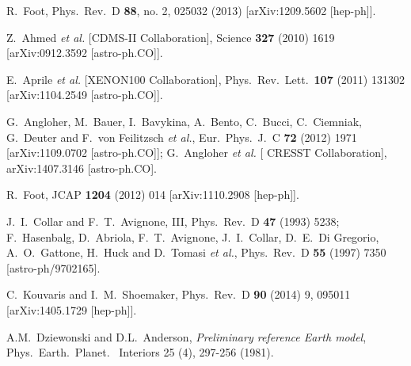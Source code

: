 \documentclass[12pt]{article}
\begin{document}
\begin{thebibliography}{999}
  
  R.~Foot,
  Phys.\ Rev.\ D {\bf 88}, no. 2, 025032 (2013)
  [arXiv:1209.5602 [hep-ph]].
  
  Z.~Ahmed {\it et al.}  [CDMS-II Collaboration],
  Science {\bf 327} (2010) 1619
  [arXiv:0912.3592 [astro-ph.CO]].
  
  E.~Aprile {\it et al.}  [XENON100 Collaboration],
  Phys.\ Rev.\ Lett.\  {\bf 107} (2011) 131302
  [arXiv:1104.2549 [astro-ph.CO]].
  
  G.~Angloher, M.~Bauer, I.~Bavykina, A.~Bento, C.~Bucci, C.~Ciemniak, G.~Deuter and F.~von Feilitzsch {\it et al.},
  Eur.\ Phys.\ J.\ C {\bf 72} (2012) 1971
  [arXiv:1109.0702 [astro-ph.CO]];
  G.~Angloher {\it et al.}  [ CRESST Collaboration],
  arXiv:1407.3146 [astro-ph.CO].

  R.~Foot,
  JCAP {\bf 1204} (2012) 014
  [arXiv:1110.2908 [hep-ph]].
  
  J.~I.~Collar and F.~T.~Avignone, III,
  Phys.\ Rev.\ D {\bf 47} (1993) 5238;
  F.~Hasenbalg, D.~Abriola, F.~T.~Avignone, J.~I.~Collar, D.~E.~Di Gregorio, A.~O.~Gattone, H.~Huck and D.~Tomasi {\it et al.},
  Phys.\ Rev.\ D {\bf 55} (1997) 7350
  [astro-ph/9702165].
  
  C.~Kouvaris and I.~M.~Shoemaker,
  Phys.\ Rev.\ D {\bf 90} (2014) 9,  095011
  [arXiv:1405.1729 [hep-ph]].
  
  A.M.~Dziewonski and D.L.~Anderson, \textit{Preliminary reference Earth model},
  Phys.\ Earth.\ Planet. \ Interiors 25 (4), 297-256 (1981).
  
\end{thebibliography}
\end{document}
